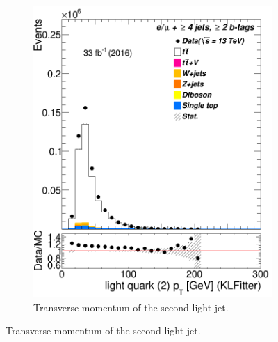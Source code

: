 \begin{figure}
\begin{subfigure}{0.35\textwidth}
		\includegraphics[width=\linewidth]{ControlPlots_emujets_2016_4incl_2incl/klf_lq2_pt_emujets_2016.png}
		\caption{Transverse momentum of the second light jet.} \label{fig:klf15}
	\end{subfigure}
	

\end{figure}
